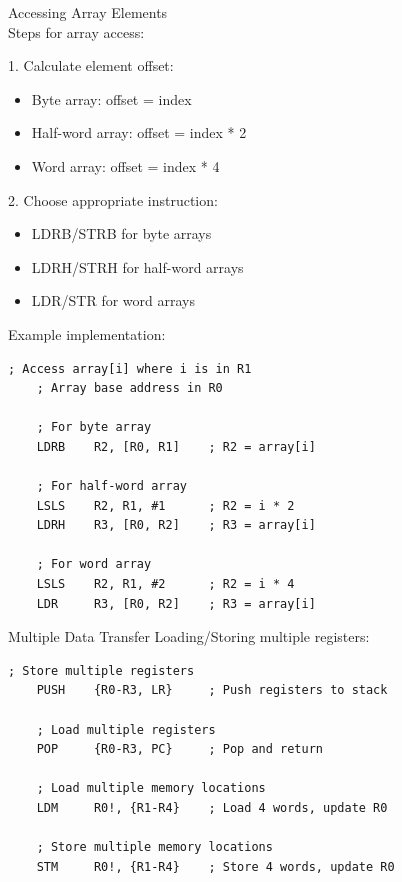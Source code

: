\begin{KR}{Accessing Array Elements}\\
Steps for array access:

1. Calculate element offset:
   \begin{itemize}
     \item Byte array: offset = index
     \item Half-word array: offset = index * 2
     \item Word array: offset = index * 4
   \end{itemize}

2. Choose appropriate instruction:
   \begin{itemize}
     \item LDRB/STRB for byte arrays
     \item LDRH/STRH for half-word arrays
     \item LDR/STR for word arrays
   \end{itemize}

Example implementation:
\begin{lstlisting}[language=armasm, style=base]
    ; Access array[i] where i is in R1
    ; Array base address in R0
    
    ; For byte array
    LDRB    R2, [R0, R1]    ; R2 = array[i]
    
    ; For half-word array
    LSLS    R2, R1, #1      ; R2 = i * 2
    LDRH    R3, [R0, R2]    ; R3 = array[i]
    
    ; For word array
    LSLS    R2, R1, #2      ; R2 = i * 4
    LDR     R3, [R0, R2]    ; R3 = array[i]
\end{lstlisting}
\end{KR}

\begin{example2}{Multiple Data Transfer}
Loading/Storing multiple registers:
\begin{lstlisting}[language=armasm, style=base]
    ; Store multiple registers
    PUSH    {R0-R3, LR}     ; Push registers to stack
    
    ; Load multiple registers
    POP     {R0-R3, PC}     ; Pop and return
    
    ; Load multiple memory locations
    LDM     R0!, {R1-R4}    ; Load 4 words, update R0
    
    ; Store multiple memory locations
    STM     R0!, {R1-R4}    ; Store 4 words, update R0
\end{lstlisting}
\end{example2}

